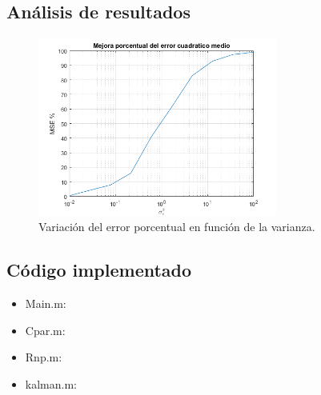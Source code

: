 \subsection{Análisis de resultados}

\begin{figure}[H]
\centering
	\includegraphics[width=0.7\textwidth, trim = {0 0 0 0},clip]{./Imagenes/Error_porcentual.png}
	\caption{Variación del error porcentual en función de la varianza.}
	\label{fig:errorporcent}
\end{figure}

\subsection{Código implementado}
\begin{itemize}
\item Main.m:
	
	
\item Cpar.m:
	
	
\item Rnp.m:
	
	
\item kalman.m:
	

\end{itemize}

